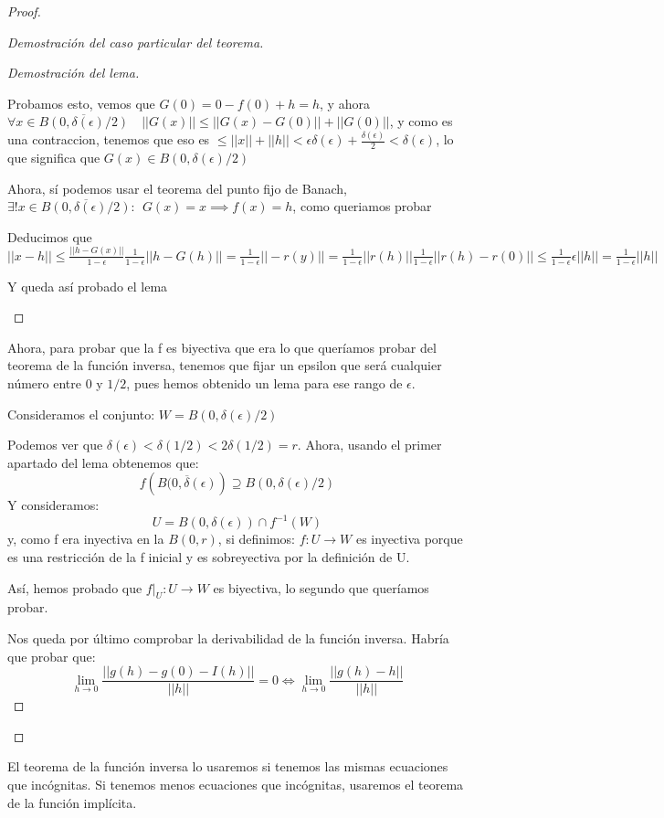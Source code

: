\begin{proof}
\begin{proof}[Demostración del caso particular del teorema]
\begin{proof}[Demostración del lema]
\begin{nlist}
	Probamos esto, vemos que $G(0) = 0-f(0) + h = h$, y ahora $\forall x \in \overline{B(0, \delta(\epsilon)/2)} \quad ||G(x)|| \leq ||G(x)-G(0)|| +||G(0)||$, y como es una contraccion, tenemos que eso es $\leq ||x|| + || h || < \epsilon \delta(\epsilon) + \frac{\delta(\epsilon)}{2} < \delta (\epsilon)$, lo que significa que $G(x) \in B(0, \delta(\epsilon)/2)$

	Ahora, sí podemos usar el teorema del punto fijo de Banach, $\exists ! x \in \overline{B(0, \delta(\epsilon)/2)}: \ \ G(x) = x \implies f(x) = h$, como queriamos probar
	\item Deducimos que $||x-h || \leq \frac{||h-G(x)||}{1-\epsilon} \frac{1}{1-\epsilon} || h - G(h)|| = \frac{1}{1-\epsilon} || -r(y)|| =  \frac{1}{1-\epsilon} || r(h)|| \frac{1}{1-\epsilon} || r(h) - r(0)|| \leq \frac{1}{1-\epsilon} \epsilon|| h|| = \frac{1}{1-\epsilon} ||h||$

	Y queda así probado el lema
\end{nlist}
\end{proof} %

Ahora, para probar que la f es biyectiva que era lo que queríamos probar del teorema de la función inversa, tenemos que fijar un epsilon que será cualquier número entre $0 $ y $1/2$, pues hemos obtenido un lema para ese rango de $\epsilon$.

Consideramos el conjunto: $W = B(0, \delta(\epsilon)/2)$


Podemos ver que $\delta(\epsilon) < \delta(1/2) < 2 \delta(1/2) = r$. Ahora, usando el primer apartado del lema obtenemos que:
\[
f(\overline{B(0,\delta(\epsilon)}) \supseteq B(0, \delta(\epsilon)/2)
\]
Y consideramos:
\[
U= B(0, \delta(\epsilon)) \cap f^{-1}(W)
\]
y, como f era inyectiva en la $B(0,r)$, si definimos: $f: U \to W$ es inyectiva porque es una restricción de la f inicial y es sobreyectiva por la definición de U.

Así, hemos probado que $f|_U : U \to W$ es biyectiva, lo segundo que queríamos probar.

Nos queda por último comprobar la derivabilidad de la función inversa. Habría que probar que:
\[
\lim_{h\to 0}\frac{||g(h) - g(0) -I(h) ||}{||h|| } = 0 \iff \lim_{h \to 0}\frac{||g(h) - h||}{||h||}
\]


\end{proof} %
\end{proof} %

El teorema de la función inversa lo usaremos si tenemos las mismas ecuaciones que incógnitas. Si tenemos menos ecuaciones que incógnitas, usaremos el teorema de la función implícita.

